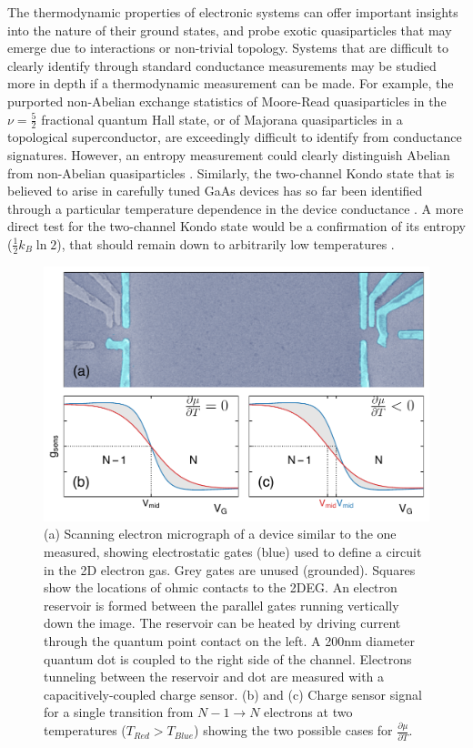 \documentclass[twocolumn,showpacs,preprintnumbers,amsmath,amssymb,pra,aps,superscriptaddress]{revtex4-1}
\begin{document}
The thermodynamic properties of electronic systems can offer important insights into the nature of their ground states, and probe exotic quasiparticles that may emerge due to interactions or non-trivial topology.  Systems that are difficult to clearly identify through standard conductance measurements may be studied more in depth if a thermodynamic measurement can be made. For example, the purported non-Abelian exchange statistics of Moore-Read quasiparticles in the $\nu = \frac{5}{2}$ fractional quantum Hall state, or of Majorana quasiparticles in a topological superconductor, are exceedingly difficult to identify from conductance signatures. However, an entropy measurement could clearly distinguish Abelian from non-Abelian quasiparticles \cite{Cooper2009, Smirnov2015}.  Similarly, the two-channel Kondo state that is believed to arise in carefully tuned GaAs devices has so far been identified through a particular temperature dependence in the device conductance \cite{Potok2007}. A more direct test for the two-channel Kondo state would be a confirmation of its entropy ($\frac{1}{2} k_B \ln{2}$), that should remain down to arbitrarily low temperatures \cite{Alkurtass2016}.

\begin{figure}[!]
        \includegraphics[width=1.0\columnwidth]{../figures/figure_1_no-annotation.pdf}
        \caption{\label{fig:fig1}(a) Scanning electron micrograph of a device similar to the one measured, showing electrostatic gates (blue) used to define a circuit in the 2D electron gas. Grey gates are unused (grounded). Squares show the locations of ohmic contacts to the 2DEG. An electron reservoir is formed between the parallel gates running vertically down the image. The reservoir can be heated by driving current through the quantum point contact on the left. A 200nm diameter quantum dot is coupled to the right side of the channel. Electrons tunneling between the reservoir and dot are measured with a capacitively-coupled charge sensor. (b) and (c) Charge sensor signal for a single transition from $N-1 \rightarrow N$ electrons at two temperatures ($T_{Red} > T_{Blue}$) showing the two possible cases for $\frac{\partial \mu}{\partial T}$.}
\end{figure}
\end{document}

